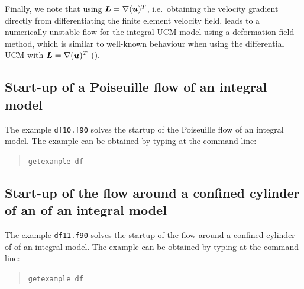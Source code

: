 Finally, we note that using $\boldsymbol{L}=\nabla(\boldsymbol{u})^T$, i.e.\ obtaining the velocity gradient directly from  differentiating the finite element velocity field, leads to a numerically unstable flow
 for the integral UCM model using a deformation field method, which is similar to well-known behaviour when using 
 the differential UCM with 
 $\boldsymbol{L}=\nabla(\boldsymbol{u})^T$ (\cite{Brown1993,Bogaerds00}).

\subsection{Start-up of a Poiseuille flow of an integral model}
\label{sec:poiseuille_df}

The example \texttt{df10.f90} solves the startup of the Poiseuille flow of an integral model.
The example can be obtained by typing at the
command line:
\medskip
\begin{quote}
   \texttt{getexample df}
\end{quote}

\subsection{Start-up of the flow around a confined cylinder of an of an integral model}
\label{sec:confined_cylinder_df}

The example \texttt{df11.f90} solves the startup of the flow around a confined cylinder of of an integral model.
The example can be obtained by typing at the
command line:
\medskip
\begin{quote}
   \texttt{getexample df}
\end{quote}



